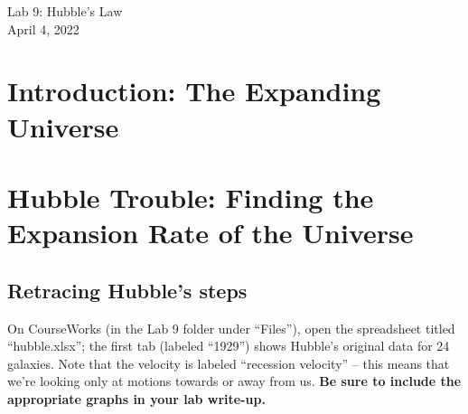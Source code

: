 \documentclass[11pt]{article}
\begin{document}
\begin{center}
\huge{Lab 9: Hubble's Law}\\ \medskip \Large{April 4, 2022}
\end{center}

\section{Introduction: The Expanding Universe}

\section{Hubble Trouble: Finding the Expansion Rate of the Universe}

\subsection{Retracing Hubble's steps}

\medskip \noindent
On CourseWorks (in the Lab 9 folder under ``Files''), open the spreadsheet titled ``hubble.xlsx''; the first tab (labeled ``1929'') shows Hubble's original data for 24 galaxies. Note that the velocity is labeled ``recession velocity'' -- this means that we're looking only at motions towards or away from us.  \textbf{Be sure to include the appropriate graphs in your lab write-up.}
\end{document}
